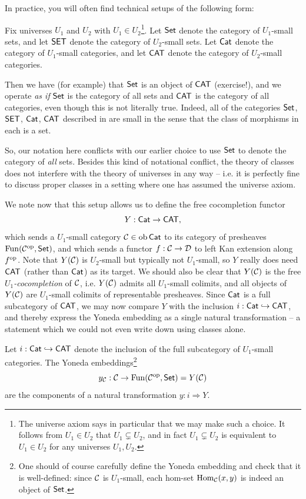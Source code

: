 In practice, you will often find technical setups of the following form:

\begin{convention}\label{conv:universe}
    Fix universes $U_1$ and $U_2$ with $U_1 \in U_2$\footnote{The universe axiom says in particular that we may make such a choice. It follows from $U_1 \in U_2$ that $U_1 \subsetneq U_2$, and in fact $U_1 \subsetneq U_2$ is equivalent to $U_1 \in U_2$ for any universes $U_1, U_2$.}. Let $\mathsf{Set}$ denote the category of $U_1$-small sets, and let $\mathsf{SET}$ denote the category of $U_2$-small sets. Let $\mathsf{Cat}$ denote the category of $U_1$-small categories, and let $\mathsf{CAT}$ denote the category of $U_2$-small categories.
\end{convention}

Then we have (for example) that $\mathsf{Set}$ is an object of $\mathsf{CAT}$ (exercise!), and we operate \emph{as if} $\mathsf{Set}$ is the category of all sets and $\mathsf{CAT}$ is the category of all categories, even though this is not literally true. Indeed, all of the categories $\mathsf{Set}$, $\mathsf{SET}$, $\mathsf{Cat}$, $\mathsf{CAT}$ described in  are small in the sense that the class of morphisms in each is a set.

So, our notation here conflicts with our earlier choice to use $\mathsf{Set}$ to denote the category of \emph{all} sets. Besides this kind of notational conflict, the theory of classes does not interfere with the theory of universes in any way -- i.e. it is perfectly fine to discuss proper classes in a setting where one has assumed the universe axiom.

We note now that this setup allows us to define the free cocompletion functor
\[Y : \mathsf{Cat} \to \mathsf{CAT},\]
which sends a $U_1$-small category $\mathcal{C} \in \operatorname{ob} \mathsf{Cat}$ to its category of presheaves $\operatorname{Fun}(\mathcal{C}^{\mathrm{op}}, \mathsf{Set})$, and which sends a functor $f : \mathcal{C} \to \mathcal{D}$ to left Kan extension along $f^{\mathrm{op}}$. Note that $Y(\mathcal{C})$ is $U_2$-small but typically not $U_1$-small, so $Y$ really does need $\mathsf{CAT}$ (rather than $\mathsf{Cat}$) as its target. We should also be clear that $Y(\mathcal{C})$ is the free \emph{$U_1$-cocompletion} of $\mathcal{C}$, i.e. $Y(\mathcal{C})$ admits all $U_1$-small colimits, and all objects of $Y(\mathcal{C})$ are $U_1$-small colimits of representable presheaves. Since $\mathsf{Cat}$ is a full subcategory of $\mathsf{CAT}$, we may now compare $Y$ with the inclusion $i : \mathsf{Cat} \hookrightarrow \mathsf{CAT}$, and thereby express the Yoneda embedding as a single natural transformation -- a statement which we could not even write down using classes alone.

\begin{proposition}\label{prop:appendix:size issues:naturality of Yoneda embeddings}
    Let $i : \mathsf{Cat} \hookrightarrow \mathsf{CAT}$ denote the inclusion of the full subcategory of $U_1$-small categories. The Yoneda embeddings\footnote{One should of course carefully define the Yoneda embedding and check that it is well-defined: since $\mathcal{C}$ is $U_1$-small, each hom-set $\operatorname{Hom}_{\mathcal{C}}(x,y)$ is indeed an object of $\mathsf{Set}$.}
    \[y_{\mathcal{C}} : \mathcal{C} \to \operatorname{Fun}(\mathcal{C}^{\mathrm{op}}, \mathsf{Set}) = Y(\mathcal{C})\]
    are the components of a natural transformation $y : i \Rightarrow Y$.
\end{proposition}

